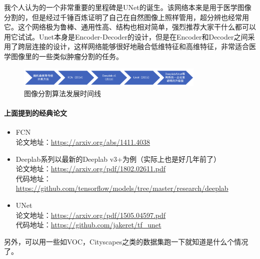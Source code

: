 \documentclass[lang=cn,11pt,a4paper]{elegant_template}
\begin{document}
我个人认为的一个非常重要的里程碑是UNet的诞生。该网络本来是用于医学图像分割的，但是经过千锤百炼证明了自己在自然图像上照样管用，超分辨也经常用它。这个网络极为鲁棒、通用性高、结构也相对简单，强烈推荐大家干什么都可以用它试试。Unet本身是Encoder-Decoder的设计，但是在Encoder和Decoder之间采用了跨层连接的设计，这样网络能够很好地融合低维特征和高维特征，非常适合医学图像里的一些类似肿瘤分割的任务。

\begin{figure}[htbp]
  \centering
  \includegraphics[width=0.8\textwidth]{image/cv_8.png}
  \caption{图像分割算法发展时间线}
\end{figure}

\paragraph{上面提到的经典论文}
\begin{itemize}
    \item FCN \\
    论文地址：\href{https://arxiv.org/abs/1411.4038}{https://arxiv.org/abs/1411.4038} 
    \item Deeplab系列以最新的Deeplab v3+为例（实际上也是好几年前了）\\
    论文地址：\href{https://arxiv.org/pdf/1802.02611.pdf}{https://arxiv.org/pdf/1802.02611.pdf} \\
    代码地址：\href{https://github.com/tensorflow/models/tree/master/research/deeplab}{https://github.com/tensorflow/models/tree/master/research/deeplab} 
    \item UNet \\
    论文地址：\href{https://arxiv.org/pdf/1505.04597.pdf}{https://arxiv.org/pdf/1505.04597.pdf} \\
    代码地址：\href{https://github.com/jakeret/tf_unet}{https://github.com/jakeret/tf\_unet} 
\end{itemize}
另外，可以用一些如VOC，Cityscapes之类的数据集跑一下就知道是什么个情况了。
\end{document}
